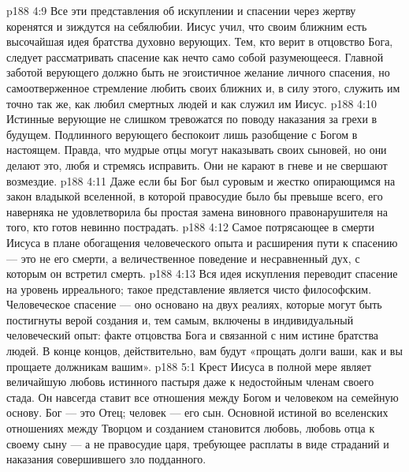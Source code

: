 \vs p188 4:9 Все эти представления об искуплении и спасении через жертву коренятся и зиждутся на себялюбии. Иисус учил, что  своим ближним есть высочайшая идея братства духовно верующих. Тем, кто верит в отцовство Бога, следует рассматривать спасение как нечто само собой разумеющееся. Главной заботой верующего должно быть не эгоистичное желание личного спасения, но самоотверженное стремление любить своих ближних и, в силу этого, служить им точно так же, как любил смертных людей и как служил им Иисус.
\vs p188 4:10 Истинные верующие не слишком тревожатся по поводу наказания за грехи в будущем. Подлинного верующего беспокоит лишь разобщение с Богом в настоящем. Правда, что мудрые отцы могут наказывать своих сыновей, но они делают это, любя и стремясь исправить. Они не карают в гневе и не свершают возмездие.
\vs p188 4:11 Даже если бы Бог был суровым и жестко опирающимся на закон владыкой вселенной, в которой правосудие было бы превыше всего, его наверняка не удовлетворила бы простая замена виновного правонарушителя на того, кто готов невинно пострадать.
\vs p188 4:12 Самое потрясающее в смерти Иисуса в плане обогащения человеческого опыта и расширения пути к спасению --- это не  его смерти, а величественное поведение и несравненный дух, с которым он встретил смерть.
\vs p188 4:13 Вся идея искупления переводит спасение на уровень ирреального; такое представление является чисто философским. Человеческое спасение ---  оно основано на двух реалиях, которые могут быть постигнуты верой создания и, тем самым, включены в индивидуальный человеческий опыт: факте отцовства Бога и связанной с ним истине братства людей. В конце концов, действительно, вам будут «прощать долги ваши, как и вы прощаете должникам вашим».
\vs p188 5:1 Крест Иисуса в полной мере являет величайшую любовь истинного пастыря даже к недостойным членам своего стада. Он навсегда ставит все отношения между Богом и человеком на семейную основу. Бог --- это Отец; человек --- его сын. Основной истиной во вселенских отношениях между Творцом и созданием становится любовь, любовь отца к своему сыну --- а не правосудие царя, требующее расплаты в виде страданий и наказания совершившего зло подданного.
